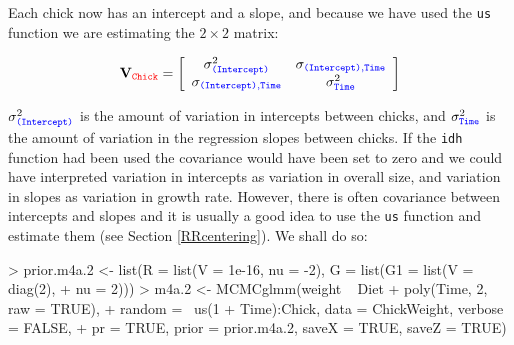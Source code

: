 \documentclass{article}
\begin{document}
Each chick now has an intercept and a slope, and because we have used the \texttt{us} function we are estimating the $2\times2$ matrix:

\begin{displaymath}
{\bf V}_{{\color{red} \texttt{Chick}}}=
\left[
\begin{array}{cc}
\sigma^{2}_{\color{blue}\texttt{(Intercept)}}&\sigma_{\color{blue}\texttt{(Intercept)}, \texttt{Time}}\\
\sigma_{\color{blue}\texttt{(Intercept)}, \texttt{Time}}&\sigma^{2}_{\color{blue} \texttt{Time}}\\
\end{array}
\right]
\end{displaymath}

$\sigma^{2}_{\color{blue}\texttt{(Intercept)}}$ is the amount of variation in intercepts between chicks, and $\sigma^{2}_{\color{blue}\texttt{Time}}$ is the amount of variation in the regression slopes between chicks. If the \texttt{idh} function had been used the covariance would have been set to zero and we could have interpreted variation in intercepts as variation in overall size, and variation in slopes as variation in growth rate.  However, there is often covariance between intercepts and slopes and it is usually a good idea to use the \texttt{us} function and estimate them (see Section \ref{RRcentering}). We shall do so: 

\begin{Schunk}
\begin{Sinput}
> prior.m4a.2 <- list(R = list(V = 1e-16, nu = -2), G = list(G1 = list(V = diag(2), 
+     nu = 2)))
> m4a.2 <- MCMCglmm(weight ~ Diet + poly(Time, 2, raw = TRUE), 
+     random = ~us(1 + Time):Chick, data = ChickWeight, verbose = FALSE, 
+     pr = TRUE, prior = prior.m4a.2, saveX = TRUE, saveZ = TRUE)
\end{Sinput}
\end{Schunk}
\end{document}
